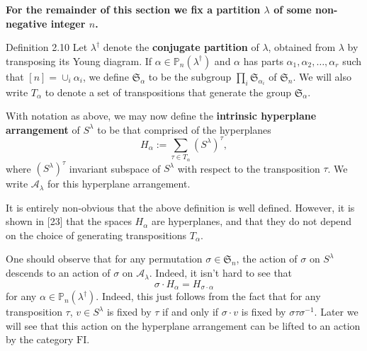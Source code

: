 \textbf{For the remainder of this section we fix a partition $\lambda$ of some non-negative integer $n$.}
\begin{sourceblock}{Definition 2.10}
Let $\lambda^\dagger$ denote the \textbf{conjugate partition} of $\lambda$, obtained from $\lambda$ by transposing its Young diagram. If $\alpha\in\mathbb{P}_n(\lambda^\dagger)$ and $\alpha$ has parts $\alpha_1,\alpha_2,\ldots,\alpha_r$ such that $[n]=\cup_i\alpha_i$, we define $\mathfrak{S}_\alpha$ to be the subgroup $\prod_i\mathfrak{S}_{\alpha_i}$ of $\mathfrak{S}_n$. We will also write $T_\alpha$ to denote a set of transpositions that generate the group $\mathfrak{S}_\alpha$.

With notation as above, we may now define the \textbf{intrinsic hyperplane arrangement} of $S^\lambda$ to be that comprised of the hyperplanes
\[
 H_\alpha:=\sum_{\tau\in T_\alpha}(S^\lambda)^\tau,
\]
where $(S^\lambda)^\tau$ invariant subspace of $S^\lambda$ with respect to the transposition $\tau$. We write $\mathcal{A}_\lambda$ for this hyperplane arrangement.
\end{sourceblock}
It is entirely non-obvious that the above definition is well defined. However, it is shown in [23] that the spaces $H_\alpha$ are hyperplanes, and that they do not depend on the choice of generating transpositions $T_\alpha$.

One should observe that for any permutation $\sigma\in\mathfrak{S}_n$, the action of $\sigma$ on $S^\lambda$ descends to an action of $\sigma$ on $\mathcal{A}_\lambda$. Indeed, it isn't hard to see that
\[
 \sigma\cdot H_\alpha=H_{\sigma\cdot\alpha}
\]
for any $\alpha\in\mathbb{P}_n(\lambda^\dagger)$. Indeed, this just follows from the fact that for any transposition $\tau$, $v\in S^\lambda$ is fixed by $\tau$ if and only if $\sigma\cdot v$ is fixed by $\sigma\tau\sigma^{-1}$. Later we will see that this action on the hyperplane arrangement can be lifted to an action by the category $\mathrm{FI}$.

